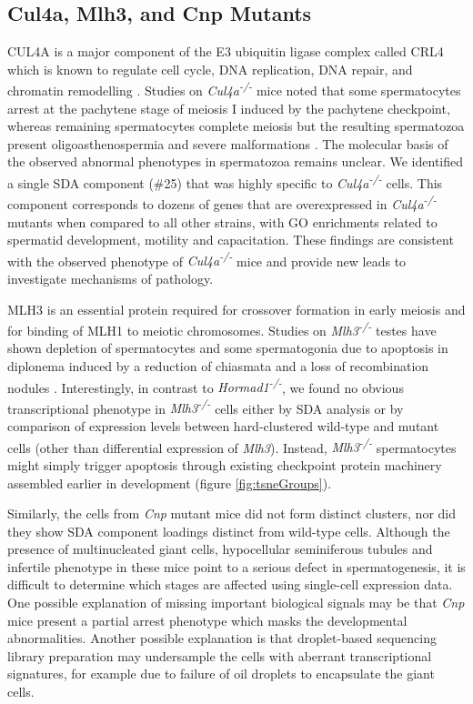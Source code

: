 \subsection{Cul4a, Mlh3, and Cnp Mutants}
CUL4A is a major component of the E3 ubiquitin ligase complex called CRL4 which is known to regulate cell cycle, DNA replication, DNA repair, and chromatin remodelling \parencite{Dubiel2018Cullin}. Studies on \textit{Cul4a\textsuperscript{-/-}} mice noted that some spermatocytes arrest at the pachytene stage of meiosis I induced by the pachytene checkpoint, whereas remaining spermatocytes complete meiosis but the resulting spermatozoa present oligoasthenospermia and severe malformations \parencite{Yin2011E3}. The molecular basis of the observed abnormal phenotypes in spermatozoa remains unclear. We identified a single SDA component (\#25) that was highly specific to \textit{Cul4a\textsuperscript{-/-}} cells. This component corresponds to dozens of genes that are overexpressed in \textit{Cul4a\textsuperscript{-/-}} mutants when compared to all other strains, with GO enrichments related to spermatid development, motility and capacitation. These findings are consistent with the observed phenotype of \textit{Cul4a\textsuperscript{-/-}} mice and provide new leads to investigate mechanisms of pathology.

MLH3 is an essential protein required for crossover formation in early meiosis and for binding of MLH1 to meiotic chromosomes. Studies on \textit{Mlh3\textsuperscript{-/-}} testes have shown depletion of spermatocytes and some spermatogonia due to apoptosis in diplonema induced by a reduction of chiasmata and a loss of recombination nodules \parencite{Lipkin2002Meiotic}. Interestingly, in contrast to \textit{Hormad1\textsuperscript{-/-}}, we found no obvious transcriptional phenotype in \textit{Mlh3\textsuperscript{-/-}} cells either by SDA analysis or by comparison of expression levels between hard-clustered wild-type and mutant cells (other than differential expression of \textit{Mlh3}). Instead, \textit{Mlh3\textsuperscript{-/-}} spermatocytes might simply trigger apoptosis through existing checkpoint protein machinery assembled earlier in development (figure \ref{fig:tsneGroups}).

Similarly, the cells from \textit{Cnp} mutant mice did not form distinct clusters, nor did they show SDA component loadings distinct from wild-type cells. Although the presence of multinucleated giant cells, hypocellular seminiferous tubules and infertile phenotype in these mice point to a serious defect in spermatogenesis, it is difficult to determine which stages are affected using single-cell expression data. One possible explanation of missing important biological signals may be that \textit{Cnp} mice present a partial arrest phenotype which masks the developmental abnormalities. Another possible explanation is that droplet-based sequencing library preparation may undersample the cells with aberrant transcriptional signatures, for example due to failure of oil droplets to encapsulate the giant cells.

